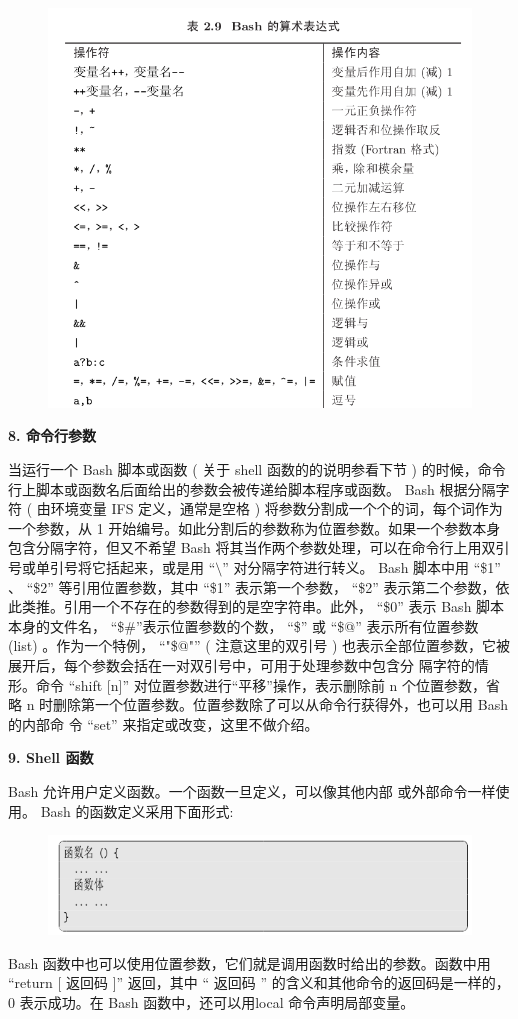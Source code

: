 \documentclass[12pt，a4paper]{article}
\numberwithin{equation}{section}
\begin{document}
\begin{figure}[H]
\centering
\includegraphics[scale=0.6]{./figures/264.png}
\end{figure}


\textbf{8. 命令行参数}

当运行一个 Bash 脚本或函数 ( 关于 shell 函数的的说明参看下节 ) 的时候，命令行上脚本或函数名后面给出的参数会被传递给脚本程序或函数。 Bash 根据分隔字符 ( 由环境变量 IFS 定义，通常是空格 ) 将参数分割成一个个的词，每个词作为一个参数，从 1 开始编号。如此分割后的参数称为位置参数。如果一个参数本身包含分隔字符，但又不希望 Bash 将其当作两个参数处理，可以在命令行上用双引号或单引号将它括起来，或是用 “$\setminus$” 对分隔字符进行转义。 Bash 脚本中用 “\$1” 、 “\$2” 等引用位置参数，其中 “\$1” 表示第一个参数， “\$2” 表示第二个参数，依此类推。引用一个不存在的参数得到的是空字符串。此外， “\$0” 表示 Bash 脚本本身的文件名， “\$\#”表示位置参数的个数， “\$\*” 或 “\$@” 表示所有位置参数 (list) 。作为一个特例， “"\$@"” ( 注意这里的双引号 ) 也表示全部位置参数，它被展开后，每个参数会括在一对双引号中，可用于处理参数中包含分
隔字符的情形。命令 “shift [n]” 对位置参数进行“平移”操作，表示删除前 n 个位置参数，省略 n 时删除第一个位置参数。位置参数除了可以从命令行获得外，也可以用 Bash 的内部命
令 “set” 来指定或改变，这里不做介绍。

\textbf{9. Shell 函数}

Bash 允许用户定义函数。一个函数一旦定义，可以像其他内部
或外部命令一样使用。 Bash 的函数定义采用下面形式:
\begin{figure}[H]
\centering
\includegraphics[scale=0.6]{./figures/279.png}
\end{figure}
Bash 函数中也可以使用位置参数，它们就是调用函数时给出的参数。函数中用 “return [ 返回码 ]” 返回，其中 “ 返回码 ” 的含义和其他命令的返回码是一样的， 0 表示成功。在 Bash 函数中，还可以用local 命令声明局部变量。
\end{document}
